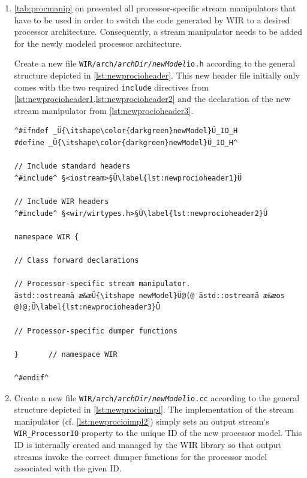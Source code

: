 \begin{enumerate}[resume]
  \item \cref{tab:procmanip} on  presented all processor-specific stream manipulators that have to be used in order to switch the code generated by \gls{WIR} to a desired processor architecture.
  Consequently, a stream manipulator needs to be added for the newly modeled processor architecture.

  Create a new file \texttt{WIR/arch/{\itshape archDir}/{\itshape newModel}io.h} according to the general structure depicted in \cref{lst:newprocioheader}.
  This new header file initially only comes with the two required \texttt{include} directives from \cref{lst:newprocioheader1,lst:newprocioheader2} and the declaration of the new stream manipulator from \cref{lst:newprocioheader3}.

\begin{lstlisting}[style=code,float=!t,caption={Rudimentary Header File for a New Processor Model's Stream Output},label=lst:newprocioheader]
^#ifndef _Ü{\itshape\color{darkgreen}newModel}Ü_IO_H
#define _Ü{\itshape\color{darkgreen}newModel}Ü_IO_H^

// Include standard headers
^#include^ §<iostream>§Ü\label{lst:newprocioheader1}Ü

// Include WIR headers
^#include^ §<wir/wirtypes.h>§Ü\label{lst:newprocioheader2}Ü

namespace WIR {

// Class forward declarations

// Processor-specific stream manipulator.
ästd::ostreamä æ&æÜ{\itshape newModel}Ü@(@ ästd::ostreamä æ&æos @)@;Ü\label{lst:newprocioheader3}Ü

// Processor-specific dumper functions

}       // namespace WIR

^#endif^
\end{lstlisting}

  \item Create a new file \texttt{WIR/arch/{\itshape archDir}/{\itshape newModel}io.cc} according to the general structure depicted in \cref{lst:newprocioimpl}.
  The implementation of the stream manipulator (cf. \cref{lst:newprocioimpl2}) simply sets an output stream's \texttt{WIR\_ProcessorIO} property to the unique ID of the new processor model.
  This ID is internally created and managed by the \gls{WIR} library so that output streams invoke the correct dumper functions for the processor model associated with the given ID.


\end{enumerate}
